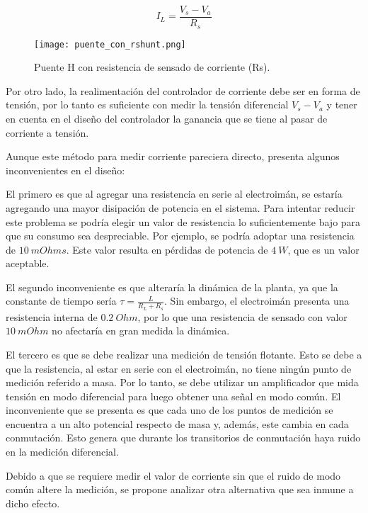 \begin{equation}
	I_L=\frac{V_s-V_a}{R_s}
\end{equation}


\begin{figure}[H]
	\centering
	\texttt{[image: puente\_con\_rshunt.png]}
	\caption{Puente H con resistencia de sensado de corriente (Rs).}
	\label{fig:img_puente_con_rshunt}
\end{figure}

Por otro lado, la realimentación del controlador de corriente debe ser en forma de tensión, por lo tanto es suficiente con medir la tensión diferencial $V_s-V_a$ y tener en cuenta en el diseño del controlador la ganancia que se tiene al pasar de corriente a tensión.

Aunque este método para medir corriente pareciera directo, presenta algunos inconvenientes en el diseño:

El primero es que al agregar una resistencia en serie al electroimán, se estaría agregando una mayor disipación de potencia en el sistema. Para intentar reducir este problema se podría elegir un valor de resistencia lo suficientemente bajo para que su consumo sea despreciable. Por ejemplo, se podría adoptar una resistencia de $10\:mOhms$. Este valor resulta en pérdidas de potencia de $4\:W$, que es un valor aceptable. 

El segundo inconveniente es que alteraría la dinámica de la planta, ya que la constante de tiempo sería $\tau=\frac{L}{R_L+R_s}$. Sin embargo, el electroimán presenta una resistencia interna de $0.2\:Ohm$, por lo que una resistencia de sensado con valor $10\:mOhm$ no afectaría en gran medida la dinámica.

El tercero es que se debe realizar una medición de tensión flotante. Esto se debe a que la resistencia, al estar en serie con el electroimán, no tiene ningún punto de medición referido a masa. Por lo tanto, se debe utilizar un amplificador que mida tensión en modo diferencial para luego obtener una señal en modo común. El inconveniente que se presenta es que cada uno de los puntos de medición se encuentra a un alto potencial respecto de masa y, además, este cambia en cada conmutación. Esto genera que durante los transitorios de conmutación haya ruido en la medición diferencial.

Debido a que se requiere medir el valor de corriente sin que el ruido de modo común altere la medición, se propone analizar otra alternativa que sea inmune a dicho efecto.



